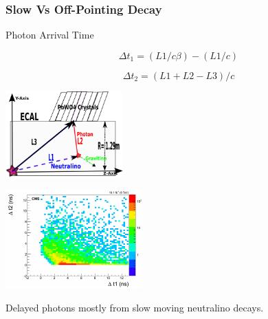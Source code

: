 \documentclass{beamer}
\begin{document}
\begin{frame}
\frametitle{Slow Vs Off-Pointing Decay}
  \begin{minipage}[t]{0.7\paperwidth}
    \begin{multicols}{2}
      \begin{varblock}[3.5cm]{Photon Arrival Time}
         
          $$\Delta t_{1} = (L1/c\beta) - (L1/c)$$
    
          $$\Delta t_{2} = (L1 + L2 - L3)/c $$   
           
      \end{varblock}
     \columnbreak
     \includegraphics[height=3.30cm, width=0.4\paperwidth]{THESISPLOTS/DelayedPhoton-ECAL.png}
     
    \end{multicols} 
  \end{minipage}
  
  \begin{minipage}[t]{0.8\paperwidth}
    \includegraphics[height=3.8cm, width=0.7\paperwidth]{THESISPLOTS/dt1_dt2_late.png}
  \end{minipage}
  \vspace{-0.1cm}
  Delayed photons mostly from slow moving neutralino decays.

\end{frame}
\end{document}
